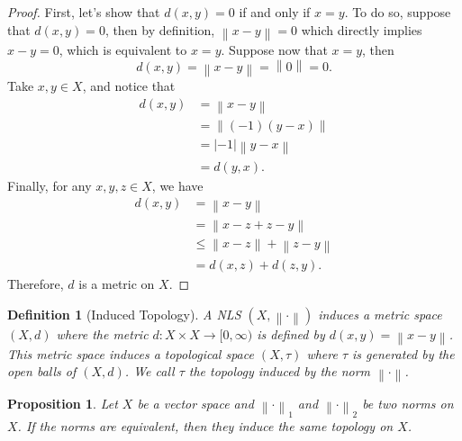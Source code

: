 \documentclass[12pt]{article}
\newtheorem*{proposition}{Proposition}
\newtheorem*{definition}{Definition}
\newcommand{\lnorm}[2]{\left\lVert#2 \right\rVert_{#1}}
\newcommand{\norm}[1]{\left\lVert#1 \right\rVert}
\begin{document}
\begin{proof}
    First, let's show that $d(x,y) = 0$ if and only if $x = y$. To do so, suppose that $d(x,y) = 0$, then by definition, $\norm{x - y} = 0$ which directly implies $x - y = 0$, which is equivalent to $x = y$. Suppose now that $x = y$, then 
    $$d(x,y) = \norm{x - y} = \norm{0} = 0.$$
    Take $x,y \in X$, and notice that
    \begin{align*}
        d(x,y) &= \norm{ x- y}\\
        &= \norm{(-1)(y - x)} \\
        & = |-1|\norm{y - x} \\
        &= d(y,x).
    \end{align*}
    Finally, for any $x,y,z \in X$, we have
    \begin{align*}
        d(x,y) &= \norm{x - y} \\
        &= \norm{x - z + z - y} \\
        &\leq \norm{x - z} + \norm{z - y} \\
        &= d(x,z) + d(z,y).
    \end{align*}
    Therefore, $d$ is a metric on $X$.
\end{proof}

\begin{definition}[Induced Topology]
    A NLS $(X, \norm{\cdot})$ induces a metric space $(X, d)$ where the metric $d : X \times X \to [0, \infty)$ is defined by $d(x,y) = \norm{x - y}$. This metric space induces a topological space $(X, \tau)$ where $\tau$ is generated by the open balls of $(X, d)$. We call $\tau$ the topology induced by the norm $\norm{\cdot}$.
\end{definition}

\begin{proposition}
    Let $X$ be a vector space and $\lnorm{1}{\cdot}$ and $\lnorm{2}{\cdot}$ be two norms on $X$. If the norms are equivalent, then they induce the same topology on $X$.
\end{proposition}
\end{document}
